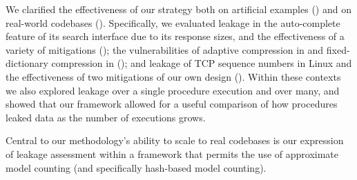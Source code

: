 We clarified the effectiveness of our strategy both on artificial
examples () and on real-world codebases
().  Specifically, we evaluated leakage in
the \sphinx auto-complete feature of its search interface due to its
response sizes, and the effectiveness of a variety of mitigations
(); the \crime vulnerabilities of
adaptive compression in \gzip and fixed-dictionary compression in
\smaz (); and leakage of TCP sequence
numbers in Linux and the effectiveness of two mitigations of our own
design ().  Within these contexts we also
explored leakage over a single procedure execution and over many, and
showed that our framework allowed for a useful comparison of how
procedures leaked data as the number of executions grows.

Central to our methodology's ability to scale to real codebases is our
expression of leakage assessment within a framework that permits the
use of approximate model counting (and specifically hash-based model
counting). 






